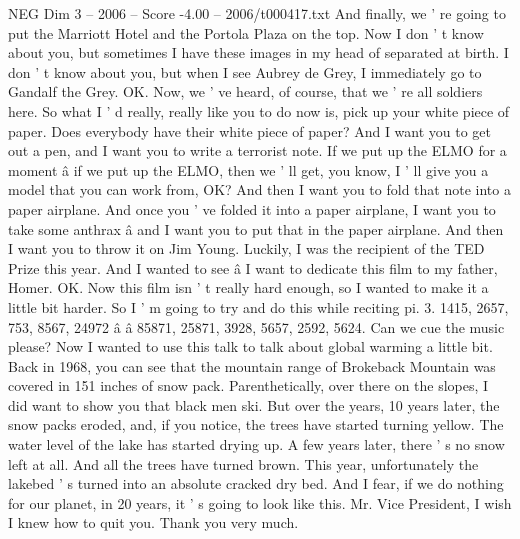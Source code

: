 \begin{textsample}{NEG Dim 3 – 2006 – Score -4.00 – 2006/t000417.txt}
And finally, we ' re going to put the Marriott Hotel and the Portola Plaza on the top.
Now I don ' t know about you, but sometimes I have these images in my head of separated at birth.
I don ' t know about you, but when I see Aubrey de Grey, I immediately go to Gandalf the Grey.
OK.
Now, we ' ve heard, of course, that we ' re all soldiers here.
So what I ' d really, really like you to do now is, pick up your white piece of paper.
Does everybody have their white piece of paper?
And I want you to get out a pen, and I want you to write a terrorist note.
If we put up the ELMO for a moment â if we put up the ELMO, then we ' ll get, you know, I ' ll give you a model that you can work from, OK?
And then I want you to fold that note into a paper airplane.
And once you ' ve folded it into a paper airplane, I want you to take some anthrax â and I want you to put that in the paper airplane.
And then I want you to throw it on Jim Young.
Luckily, I was the recipient of the TED Prize this year.
And I wanted to see â I want to dedicate this film to my father, Homer.
OK.
Now this film isn ' t really hard enough, so I wanted to make it a little bit harder.
So I ' m going to try and do this while reciting pi. 3. 1415, 2657, 753, 8567, 24972 â â 85871, 25871, 3928, 5657, 2592, 5624.
Can we cue the music please?
Now I wanted to use this talk to talk about global warming a little bit.
Back in 1968, you can see that the mountain range of Brokeback Mountain was covered in 151 inches of snow pack.
Parenthetically, over there on the slopes, I did want to show you that black men ski.
But over the years, 10 years later, the snow packs eroded, and, if you notice, the trees have started turning yellow.
The water level of the lake has started drying up.
A few years later, there ' s no snow left at all.
And all the trees have turned brown.
This year, unfortunately the lakebed ' s turned into an absolute cracked dry bed.
And I fear, if we do nothing for our planet, in 20 years, it ' s going to look like this.
Mr.
Vice President, I wish I knew how to quit you.
Thank you very much.

\end{textsample}
